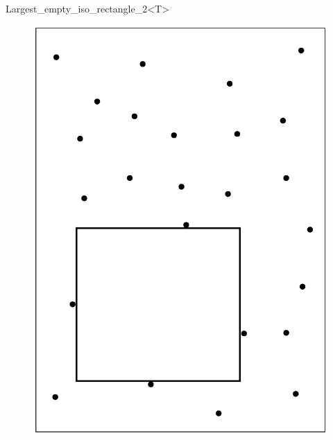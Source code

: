 

\begin{ccRefClass}{Largest_empty_iso_rectangle_2<T>}


\begin{figure}[h]
\begin{ccTexOnly}
    \centerline{
      \includegraphics{ler_example.ps}
    }
\end{ccTexOnly}


\end{figure}
\end{ccRefClass}
